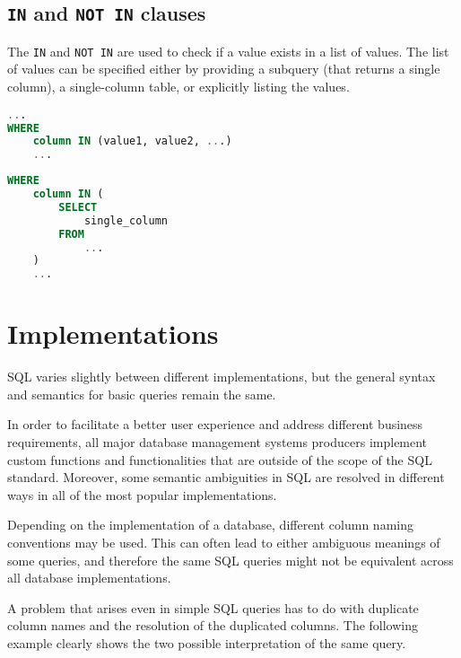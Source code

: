 \documentclass[magisterska,en]{pracamgr}
\newcommand{\code}[1]{\texttt{#1}}
\begin{document}
\subsection{\code{IN} and \code{NOT IN} clauses}
The \code{IN} and \code{NOT IN} are used to check if a value exists in a list of values. The list of values can be specified either by providing a subquery (that returns a single column), a single-column table, or explicitly listing the values.

\begin{lstlisting}[language=SQL]
...
WHERE
    column IN (value1, value2, ...)
    ...
\end{lstlisting}

\begin{lstlisting}[language=SQL]
WHERE
    column IN (
        SELECT
            single_column
        FROM
            ...
    )
    ...
\end{lstlisting}


\section{Implementations}

SQL varies slightly between different implementations, but the general syntax and semantics for basic queries remain the same.

In order to facilitate a better user experience and address different business requirements, all major database management systems producers implement custom functions and functionalities that are outside of the scope of the SQL standard. Moreover, some semantic ambiguities in SQL are resolved in different ways in all of the most popular implementations.

Depending on the implementation of a database, different column naming conventions may be used. This can often lead to either ambiguous meanings of some queries, and therefore the same SQL queries might not be equivalent across all database implementations.

A problem that arises even in simple SQL queries has to do with duplicate column names and the resolution of the duplicated columns. The following example clearly shows the two possible interpretation of the same query.
\end{document}
